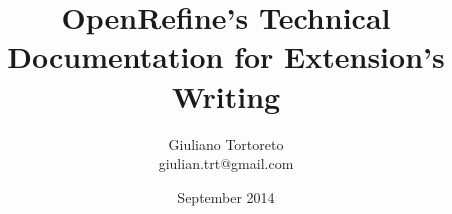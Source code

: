 \documentclass[11pt,a4paper]{article}
\begin{document}
\title{OpenRefine's Technical Documentation for Extension's Writing}
\date{September 2014}
\author{Giuliano Tortoreto\\ giulian.trt@gmail.com}
	\maketitle
	
\end{document}

